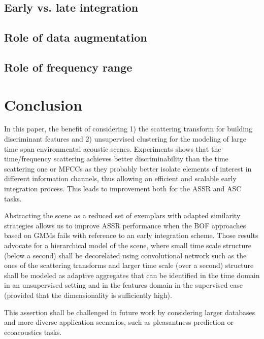 \documentclass[journal]{IEEEtran}
\makeatletter
\newcommand*{\vs}{vs.\@\xspace}
\makeatother
\begin{document}
\subsection{Early \vs late integration}

\subsection{Role of data augmentation}

\subsection{Role of frequency range}

\section{Conclusion}

In this paper, the benefit of considering 1) the scattering transform for building discriminant features and 2) unsupervised clustering for the modeling of large time span environmental acoustic scenes. Experiments shows that the time/frequency scattering achieves better discriminability than the time scattering one or MFCCs as they probably better isolate elements of interest in different information channels, thus allowing an efficient and scalable early integration process. This leads to improvement both for the ASSR and ASC tasks.

Abstracting the scene as a reduced set of exemplars with adapted similarity strategies allows us to improve ASSR performance when the BOF approaches based on GMMs fails with reference to an early integration scheme. Those results advocate for a hierarchical model of the scene, where small time scale structure  (below a second) shall be decorelated using convolutional network such as the ones of the scattering transforms and larger time scale (over a second) structure shall be modeled as adaptive aggregates that can be identified in the time domain in an unsupervised setting and in the features domain in the supervised case (provided that the dimensionality is sufficiently high). 

This assertion shall be challenged in future work by considering larger databases and more diverse application scenarios, such as pleasantness prediction \cite{acta} or ecoacoustics tasks.




% 
\end{document}
